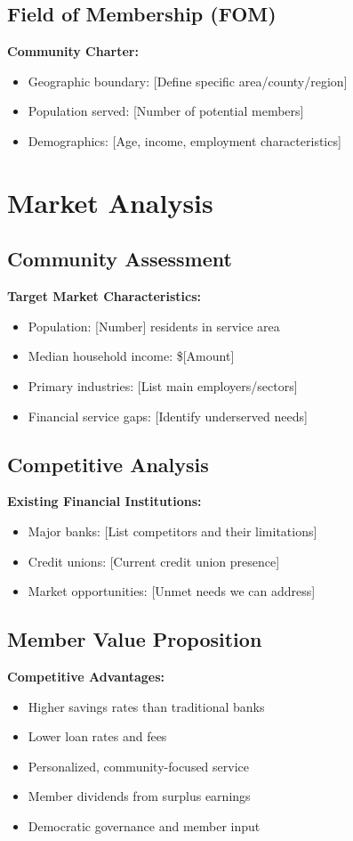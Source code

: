 \documentclass[11pt,letterpaper]{article}
\begin{document}
\subsection{Field of Membership (FOM)}
\textbf{Community Charter:}
\begin{itemize}[leftmargin=*]
    \item Geographic boundary: [Define specific area/county/region]
    \item Population served: [Number of potential members]
    \item Demographics: [Age, income, employment characteristics]
\end{itemize}

\section{Market Analysis}

\subsection{Community Assessment}
\textbf{Target Market Characteristics:}
\begin{itemize}[leftmargin=*]
    \item Population: [Number] residents in service area
    \item Median household income: \$[Amount]
    \item Primary industries: [List main employers/sectors]
    \item Financial service gaps: [Identify underserved needs]
\end{itemize}

\subsection{Competitive Analysis}
\textbf{Existing Financial Institutions:}
\begin{itemize}[leftmargin=*]
    \item Major banks: [List competitors and their limitations]
    \item Credit unions: [Current credit union presence]
    \item Market opportunities: [Unmet needs we can address]
\end{itemize}

\subsection{Member Value Proposition}
\textbf{Competitive Advantages:}
\begin{itemize}[leftmargin=*]
    \item Higher savings rates than traditional banks
    \item Lower loan rates and fees
    \item Personalized, community-focused service
    \item Member dividends from surplus earnings
    \item Democratic governance and member input
\end{itemize}
\end{document}
